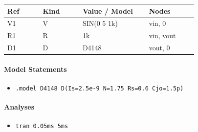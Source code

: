 \begin{longtable}{p{0.16\linewidth}p{0.18\linewidth}p{0.30\linewidth}p{0.22\linewidth}}
\textbf{Ref} & \textbf{Kind} & \textbf{Value / Model} & \textbf{Nodes}\\
\hline
V1 & V & SIN(0 5 1k) & vin, 0\\
R1 & R & 1k & vin, vout\\
D1 & D & D4148 & vout, 0\\
\end{longtable}

\paragraph{Model Statements}
\begin{itemize}
  \item \texttt{.model D4148 D(Is=2.5e-9 N=1.75 Rs=0.6 Cjo=1.5p)}
\end{itemize}

\paragraph{Analyses}
\begin{itemize}
  \item \texttt{tran 0.05ms 5ms}
\end{itemize}
